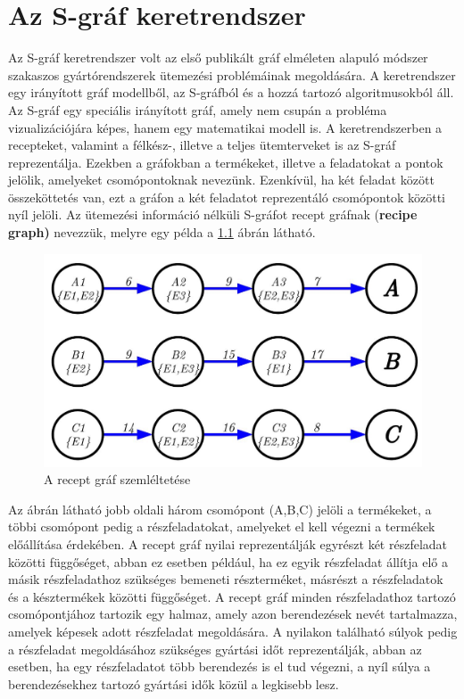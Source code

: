 \chapter{Az S-gráf keretrendszer}
Az S-gráf keretrendszer volt az első publikált gráf elméleten alapuló módszer szakaszos gyártórendszerek ütemezési problémáinak megoldására. \cite{Sanmarti2002}
A keretrendszer egy irányított gráf modellből, az S-gráfból és a hozzá tartozó algoritmusokból áll. \cite{SANMARTI1998S847}
Az S-gráf egy speciális irányított gráf, amely nem csupán a probléma vizualizációjára képes, hanem egy matematikai modell is.
A keretrendszerben a recepteket, valamint a félkész-, illetve a teljes ütemterveket is az S-gráf reprezentálja.
Ezekben a gráfokban a termékeket, illetve a feladatokat a pontok jelölik, amelyeket csomópontoknak nevezünk.
Ezenkívül, ha két feladat között összeköttetés van, ezt a gráfon a két feladatot reprezentáló csomópontok közötti nyíl jelöli.
Az ütemezési információ nélküli S-gráfot recept gráfnak (\textbf{recipe graph)} nevezzük, melyre egy példa a \ref{recipeGraph} ábrán látható.
\begin{figure}[H]
\begin{center}
\includegraphics[scale=0.35]{recipeGraph}
\caption{A recept gráf szemléltetése}
\label{recipeGraph}
\end{center}
\end{figure}
Az ábrán látható jobb oldali három csomópont (A,B,C) jelöli a termékeket, a többi csomópont pedig a részfeladatokat, amelyeket el kell végezni a termékek előállítása érdekében.
A recept gráf nyilai reprezentálják egyrészt két részfeladat közötti függőséget, abban ez esetben például, ha ez egyik részfeladat állítja elő a másik részfeladathoz szükséges bemeneti részterméket, másrészt a részfeladatok és a késztermékek közötti függőséget.
A recept gráf minden részfeladathoz tartozó csomópontjához tartozik egy halmaz, amely azon berendezések nevét tartalmazza, amelyek képesek adott részfeladat megoldására.
A nyilakon található súlyok pedig a részfeladat megoldásához szükséges gyártási időt reprezentálják, abban az esetben, ha egy részfeladatot több berendezés is el tud végezni, a nyíl súlya a berendezésekhez tartozó gyártási idők közül a legkisebb lesz.

